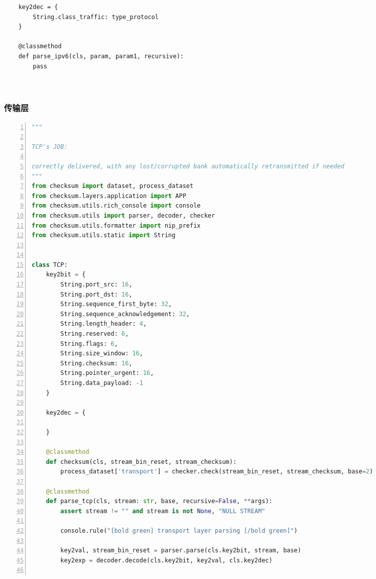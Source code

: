 \documentclass[a4paper,11pt]{article}
\begin{document}
\begin{spacing}{1.2}
\begin{CJK}{UTF8}{gbsn}
\begin{lstlisting}
    key2dec = {
        String.class_traffic: type_protocol
    }

    @classmethod
    def parse_ipv6(cls, param, param1, recursive):
        pass

         
\end{lstlisting}

\subsubsection{传输层}



\begin{lstlisting}[language = Python, numbers=left, numberstyle=\tiny,keywordstyle=\color{blue!70},commentstyle=\color{red!50!green!50!blue!50},frame=shadowbox,rulesepcolor=\color{red!20!green!20!blue!20},basicstyle=\ttfamily]
"""

TCP's JOB:

correctly delivered, with any lost/corrupted bank automatically retransmitted if needed
"""
from checksum import dataset, process_dataset
from checksum.layers.application import APP
from checksum.utils.rich_console import console
from checksum.utils import parser, decoder, checker
from checksum.utils.formatter import nip_prefix
from checksum.utils.static import String


class TCP:
    key2bit = {
        String.port_src: 16,
        String.port_dst: 16,
        String.sequence_first_byte: 32,
        String.sequence_acknowledgement: 32,
        String.length_header: 4,
        String.reserved: 6,
        String.flags: 6,
        String.size_window: 16,
        String.checksum: 16,
        String.pointer_urgent: 16,
        String.data_payload: -1
    }

    key2dec = {

    }

    @classmethod
    def checksum(cls, stream_bin_reset, stream_checksum):
        process_dataset['transport'] = checker.check(stream_bin_reset, stream_checksum, base=2)

    @classmethod
    def parse_tcp(cls, stream: str, base, recursive=False, **args):
        assert stream != "" and stream is not None, "NULL STREAM"

        console.rule("[bold green] transport layer parsing [/bold green]")

        key2val, stream_bin_reset = parser.parse(cls.key2bit, stream, base)
        key2exp = decoder.decode(cls.key2bit, key2val, cls.key2dec)


\end{lstlisting}
\end{CJK}
\end{spacing}
\end{document}
